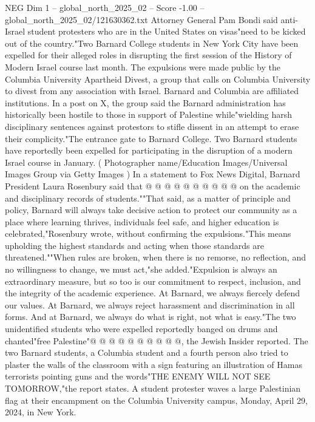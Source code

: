 \begin{textsample}{NEG Dim 1 – global\_north\_2025\_02 – Score -1.00 – global\_north\_2025\_02/121630362.txt}  \label{ex:f1_neg_009}
Attorney General Pam Bondi said anti-Israel student protesters who are in the United States on visas"need to be kicked out of the country."Two Barnard College students in New York City have been expelled for their alleged roles in disrupting the first session of the History of Modern Israel course last month.
The expulsions were made public by the Columbia University Apartheid Divest, a group that calls on Columbia University to divest from any association with Israel.
Barnard and Columbia are affiliated institutions.
In a post on X, the group said the Barnard administration has historically been hostile to those in support of Palestine while"wielding harsh disciplinary sentences against protestors to stifle dissent in an attempt to erase their complicity."The entrance gate to Barnard College.
Two Barnard students have reportedly been expelled for participating in the disruption of a modern Israel course in January. ( Photographer name/Education Images/Universal Images Group via Getty Images ) In a statement to Fox News Digital, Barnard President Laura Rosenbury said that @ @ @ @ @ @ @ @ @ @ on the academic and disciplinary records of students.""That said, as a matter of principle and policy, Barnard will always take decisive action to protect our community as a place where learning thrives, individuals feel safe, and higher education is celebrated,"Rosenbury wrote, without confirming the expulsions."This means upholding the highest standards and acting when those standards are threatened.""When rules are broken, when there is no remorse, no reflection, and no willingness to change, we must act,"she added."Expulsion is always an extraordinary measure, but so too is our commitment to respect, inclusion, and the integrity of the academic experience.
At Barnard, we always fiercely defend our values.
At Barnard, we always reject harassment and discrimination in all forms.
And at Barnard, we always do what is right, not what is easy."The two unidentified students who were expelled reportedly banged on drums and chanted"free Palestine"@ @ @ @ @ @ @ @ @ @, the Jewish Insider reported.
The two Barnard students, a Columbia student and a fourth person also tried to plaster the walls of the classroom with a sign featuring an illustration of Hamas terrorists pointing guns and the words"THE ENEMY WILL NOT SEE TOMORROW,"the report states.
A student protester waves a large Palestinian flag at their encampment on the Columbia University campus, Monday, April 29, 2024, in New York.

\end{textsample}
